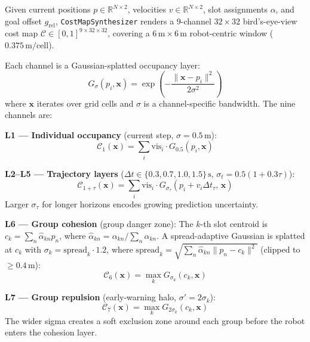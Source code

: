 \documentclass{article}
\begin{document}
Given current positions $p \in \mathbb{R}^{N \times 2}$, velocities
$v \in \mathbb{R}^{N \times 2}$, slot assignments $\alpha$, and goal offset
$g_\text{rel}$, \texttt{CostMapSynthesizer} renders a 9-channel
$32 \times 32$ bird's-eye-view cost map $\mathcal{C} \in [0,1]^{9 \times 32 \times 32}$,
covering a $6\,\text{m} \times 6\,\text{m}$ robot-centric window
($0.375\,\text{m/cell}$).

\vspace{0.3em}
Each channel is a Gaussian-splatted occupancy layer:
\begin{equation}
  G_\sigma(p_i, \mathbf{x}) = \exp\!\left(-\frac{\|\mathbf{x} - p_i\|^2}{2\sigma^2}\right)
  \label{eq:gauss}
\end{equation}
where $\mathbf{x}$ iterates over grid cells and $\sigma$ is a channel-specific
bandwidth. The nine channels are:

\vspace{0.4em}
\noindent\textbf{L1 — Individual occupancy} (current step, $\sigma=0.5\,\text{m}$):
\begin{equation}
  \mathcal{C}_1(\mathbf{x}) = \textstyle\sum_i \text{vis}_i \cdot G_{0.5}(p_i, \mathbf{x})
\end{equation}

\noindent\textbf{L2–L5 — Trajectory layers} ($\Delta t \in \{0.3, 0.7, 1.0, 1.5\}\,\text{s}$,
$\sigma_t = 0.5(1 + 0.3\tau)$):
\begin{equation}
  \mathcal{C}_{1+\tau}(\mathbf{x}) = \textstyle\sum_i \text{vis}_i \cdot G_{\sigma_\tau}\!\left(p_i + v_i \Delta t_\tau,\, \mathbf{x}\right)
\end{equation}
Larger $\sigma_\tau$ for longer horizons encodes growing prediction uncertainty.

\noindent\textbf{L6 — Group cohesion} (group danger zone):
The $k$-th slot centroid is
$c_k = \sum_n \hat{\alpha}_{kn} p_n$, where $\hat{\alpha}_{kn} = \alpha_{kn}/\sum_n \alpha_{kn}$.
A spread-adaptive Gaussian is splatted at $c_k$ with
$\sigma_k = \text{spread}_k \cdot 1.2$, where
$\text{spread}_k = \sqrt{\sum_n \hat\alpha_{kn}\|p_n - c_k\|^2}$
(clipped to $\geq 0.4\,\text{m}$):
\begin{equation}
  \mathcal{C}_{6}(\mathbf{x}) = \max_k G_{\sigma_k}(c_k, \mathbf{x})
\end{equation}

\noindent\textbf{L7 — Group repulsion} (early-warning halo, $\sigma' = 2\sigma_k$):
\begin{equation}
  \mathcal{C}_{7}(\mathbf{x}) = \max_k G_{2\sigma_k}(c_k, \mathbf{x})
\end{equation}
The wider sigma creates a soft exclusion zone around each group before the robot
enters the cohesion layer.
\end{document}

